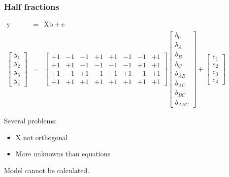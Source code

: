 \begin{frame}\frametitle{Half fractions}

	\begin{exampleblock}{}
		{\color{myOrange}{Use the least squares model to determine what we lose by only doing 4 runs, instead of the full 8.}}
	\end{exampleblock}
	$
	\begin{array}{rcl}
		\mathrm{y} &=& \mathrm{X} \mathrm{b} + \mathrm{e}\\
		\begin{bmatrix}
			y_1\\
			y_2\\
			y_3 \\
			y_4
		\end{bmatrix}
		&=&
		\begin{bmatrix}
			+1 & -1 & -1 & +1 & +1 & -1 & -1 & +1\\
			+1 & +1 & -1 & -1 & -1 & -1 & +1 & +1\\
			+1 & -1 & +1 & -1 & -1 & +1 & -1 & +1\\
			+1 & +1 & +1 & +1 & +1 & +1 & +1 & +1
		\end{bmatrix}
		\begin{bmatrix}
			b_0 \\
			b_A \\
			b_B \\
			b_{C} \\
			b_{AB} \\
			b_{AC} \\
			b_{BC} \\
			b_{ABC}
		\end{bmatrix}
		+
		\begin{bmatrix}
			e_1\\
			e_2\\
			e_3 \\
			e_4
		\end{bmatrix}
	\end{array}
	$

	Several problems:
	\begin{itemize}
		\item	$\mathrm{X}$ not orthogonal
		\item	More unknowns than equations
	\end{itemize}
	Model cannot be calculated.
\end{frame}

